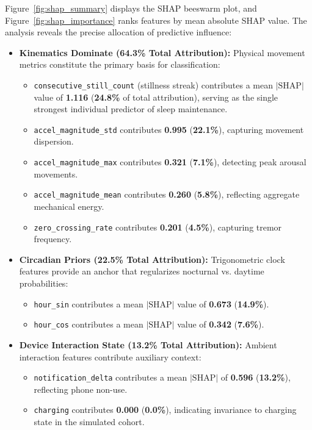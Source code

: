 \documentclass[journal,11pt,onecolumn]{IEEEtran}
\begin{document}
Figure~\ref{fig:shap_summary} displays the SHAP beeswarm plot, and Figure~\ref{fig:shap_importance} ranks features by mean absolute SHAP value. The analysis reveals the precise allocation of predictive influence:
\begin{itemize}[leftmargin=*]
    \item \textbf{Kinematics Dominate (64.3\% Total Attribution):} Physical movement metrics constitute the primary basis for classification:
    \begin{itemize}
        \item \texttt{consecutive\_still\_count} (stillness streak) contributes a mean $|\text{SHAP}|$ value of \textbf{1.116} (\textbf{24.8\%} of total attribution), serving as the single strongest individual predictor of sleep maintenance.
        \item \texttt{accel\_magnitude\_std} contributes \textbf{0.995} (\textbf{22.1\%}), capturing movement dispersion.
        \item \texttt{accel\_magnitude\_max} contributes \textbf{0.321} (\textbf{7.1\%}), detecting peak arousal movements.
        \item \texttt{accel\_magnitude\_mean} contributes \textbf{0.260} (\textbf{5.8\%}), reflecting aggregate mechanical energy.
        \item \texttt{zero\_crossing\_rate} contributes \textbf{0.201} (\textbf{4.5\%}), capturing tremor frequency.
    \end{itemize}
    \item \textbf{Circadian Priors (22.5\% Total Attribution):} Trigonometric clock features provide an anchor that regularizes nocturnal vs. daytime probabilities:
    \begin{itemize}
        \item \texttt{hour\_sin} contributes a mean $|\text{SHAP}|$ value of \textbf{0.673} (\textbf{14.9\%}).
        \item \texttt{hour\_cos} contributes a mean $|\text{SHAP}|$ value of \textbf{0.342} (\textbf{7.6\%}).
    \end{itemize}
    \item \textbf{Device Interaction State (13.2\% Total Attribution):} Ambient interaction features contribute auxiliary context:
    \begin{itemize}
        \item \texttt{notification\_delta} contributes a mean $|\text{SHAP}|$ of \textbf{0.596} (\textbf{13.2\%}), reflecting phone non-use.
        \item \texttt{charging} contributes \textbf{0.000} (\textbf{0.0\%}), indicating invariance to charging state in the simulated cohort.
    \end{itemize}
\end{itemize}
\end{document}
